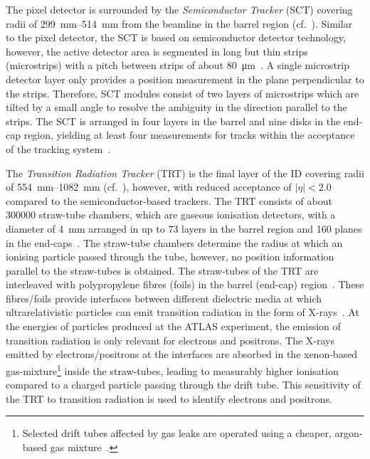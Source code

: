 The pixel detector is surrounded by the \emph{Semiconductor Tracker} (SCT)
covering radii of \SIrange{299}{514}{\milli\metre} from the beamline in the
barrel region (cf.\ ). Similar to the pixel
detector, the SCT is based on semiconductor detector technology, however, the
active detector area is segmented in long but thin strips (microstrips) with a
pitch between strips of about \SI{80}{\micro\metre}~\cite{PERF-2007-01}. A
single microstrip detector layer only provides a position measurement in the
plane perpendicular to the strips. Therefore, SCT modules consist of two layers
of microstrips which are tilted by a small angle to resolve the ambiguity in the
direction parallel to the strips. The SCT is arranged in four layers in the
barrel and nine disks in the end-cap region, yielding at least four measurements
for tracks within the acceptance of the tracking system~\cite{PERF-2007-01}.

The \emph{Transition Radiation Tracker} (TRT) is the final layer of the ID
covering radii of \SIrange{554}{1082}{\milli\metre} (cf.\
), however, with reduced acceptance of
$|\eta| < 2.0$ compared to the semiconductor-based trackers. The TRT consists of
about \num{300000} straw-tube chambers, which are gaseous ionisation detectors,
with a diameter of \SI{4}{\milli\metre} arranged in up to 73 layers in the
barrel region and 160 planes in the end-caps~\cite{PERF-2007-01}. The straw-tube
chambers determine the radius at which an ionising particle passed through the
tube, however, no position information parallel to the straw-tubes is obtained.
The straw-tubes of the TRT are interleaved with polypropylene fibres (foils) in
the barrel (end-cap) region~\cite{PERF-2007-01}. These fibres/foils provide
interfaces between different dielectric media at which ultrarelativistic
particles can emit transition radiation in the form of
X-rays~\cite{Grupen:2008zz}. At the energies of particles produced at the ATLAS
experiment, the emission of transition radiation is only relevant for electrons
and positrons. The X-rays emitted by electrons/positrons at the interfaces are
absorbed in the xenon-based gas-mixture\footnote{Selected drift tubes affected
  by gas leaks are operated using a cheaper, argon-based gas
  mixture~\cite{IDET-2015-01}.} inside the straw-tubes, leading to measurably
higher ionisation compared to a charged particle passing through the drift
tube. This sensitivity of the TRT to transition radiation is used to identify
electrons and positrons.

